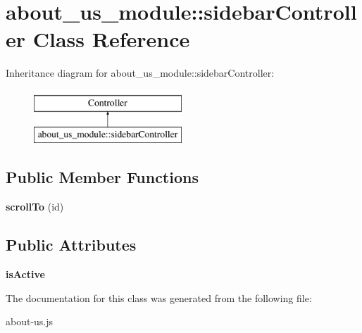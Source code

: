 \hypertarget{classabout__us__module_1_1sidebarController}{\section{about\-\_\-us\-\_\-module\-:\-:sidebar\-Controller Class Reference}
\label{classabout__us__module_1_1sidebarController}
}
Inheritance diagram for about\-\_\-us\-\_\-module\-:\-:sidebar\-Controller\-:\begin{figure}[H]
\begin{center}
\leavevmode
\includegraphics[height=2.000000cm]{classabout__us__module_1_1sidebarController}
\end{center}
\end{figure}
\subsection*{Public Member Functions}
\begin{DoxyCompactItemize}
\item 
\hypertarget{classabout__us__module_1_1sidebarController_a81e1f60ac857f46e7ef2503a31f60b91}{{\bfseries scroll\-To} (id)}\label{classabout__us__module_1_1sidebarController_a81e1f60ac857f46e7ef2503a31f60b91}

\end{DoxyCompactItemize}
\subsection*{Public Attributes}
\begin{DoxyCompactItemize}
\item 
\hypertarget{classabout__us__module_1_1sidebarController_a8672dd6cb1de416c842be0db0ce8397f}{{\bfseries is\-Active}}\label{classabout__us__module_1_1sidebarController_a8672dd6cb1de416c842be0db0ce8397f}

\end{DoxyCompactItemize}


The documentation for this class was generated from the following file\-:\begin{DoxyCompactItemize}
\item 
about-\/us.\-js\end{DoxyCompactItemize}
